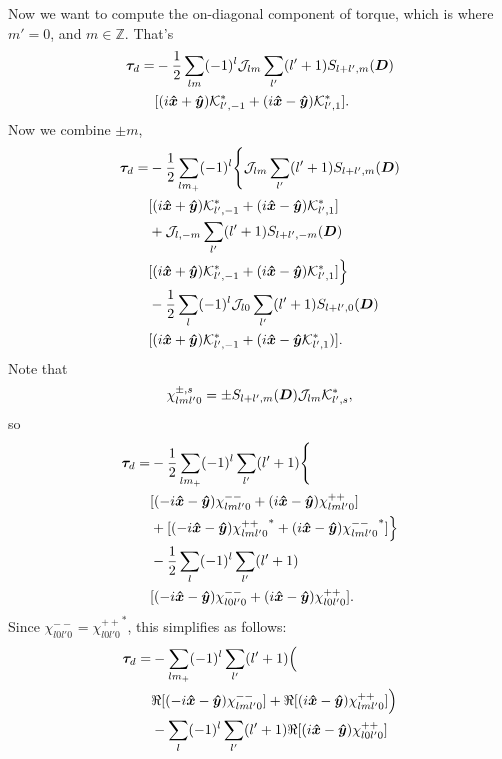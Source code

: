 \documentclass[aps,twocolumn,secnumarabic,balancelastpage,amsmath,amssymb,nofootinbib,floatfix]{revtex4-1}
\begin{document}
Now we want to compute the on-diagonal component of torque, which is where $m'=0$, and $m\in \mathbb{Z}.$ That's
\begin{equation*}
\begin{aligned}
\bm \tau_d = &-\frac{1}{2}\sum_{lm}(-1)^l\mathcal{J}_{lm}\sum_{l'}(l'+1)S_{l+l',m}(\bm D) \\
&[(i\bm{\hat x} + \bm{\hat y})\mathcal{K}^*_{l',-1}+(i\bm{\hat x}-\bm{\hat y})\mathcal{K}^*_{l',1}].
\end{aligned}
\end{equation*}
Now we combine $\pm m$,
\begin{equation*}
\begin{aligned}
\bm \tau_d = &-\frac{1}{2}\sum_{lm_+}(-1)^l\Bigg\{\mathcal{J}_{lm}\sum_{l'}(l'+1)S_{l+l',m}(\bm D) \\
&[(i\bm{\hat x} + \bm{\hat y})\mathcal{K}^*_{l',-1}+(i\bm{\hat x}-\bm{\hat y})\mathcal{K}^*_{l',1}]\\
& + \mathcal{J}_{l,-m}\sum_{l'}(l'+1)S_{l+l',-m}(\bm D) \\
& [(i\bm{\hat x} + \bm{\hat y})\mathcal{K}^*_{l',-1}+(i\bm{\hat x}-\bm{\hat y})\mathcal{K}^*_{l',1}]\Big\}\\
& - \frac{1}{2}\sum_{l}(-1)^l \mathcal{J}_{l0} \sum_{l'}(l'+1)S_{l+l',0}(\bm D)\\
& [(i\bm{\hat x} + \bm{\hat y})\mathcal{K}^*_{l',-1} + (i\bm{\hat x} - \bm{\hat y} \mathcal{K}^*_{l',1})].
\end{aligned}
\end{equation*}
Note that
$$\chi_{lml'0}^{\pm,s} = \pm S_{l+l',m}(\bm D)\mathcal{J}_{lm} \mathcal{K}^*_{l',s},$$
so
\begin{equation*}
\begin{aligned}
\bm \tau_d = &-\frac{1}{2}\sum_{lm_+}(-1)^l\sum_{l'}(l'+1)\Bigg\{ \\
&[(-i\bm{\hat x} - \bm{\hat y})\chi_{lml'0}^{--}+(i\bm{\hat x}-\bm{\hat y})\chi_{lml'0}^{++}]\\
& + [(-i\bm{\hat x} - \bm{\hat y}){\chi_{lml'0}^{++}}^*+(i\bm{\hat x}-\bm{\hat y}){\chi_{lml'0}^{--}}^*]\Big\}\\
& - \frac{1}{2}\sum_{l}(-1)^l \sum_{l'}(l'+1)\\
& [(-i\bm{\hat x} - \bm{\hat y})\chi_{l0l'0}^{--} + (i\bm{\hat x} - \bm{\hat y})\chi_{l0l'0}^{++}].
\end{aligned}
\end{equation*}
Since $\chi_{l0l'0}^{--}={\chi_{l0l'0}^{++}}^*$, this simplifies as follows:
\begin{equation*}
\begin{aligned}
\bm \tau_d = &-\sum_{lm_+}(-1)^l\sum_{l'}(l'+1)\Big( \\
&\Re[(-i\bm{\hat x} - \bm{\hat y})\chi_{lml'0}^{--}]+\Re[(i\bm{\hat x}-\bm{\hat y})\chi_{lml'0}^{++}]\Big)\\
& - \sum_{l}(-1)^l \sum_{l'}(l'+1) \Re[(i\bm{\hat x} - \bm{\hat y})\chi_{l0l'0}^{++}]
\end{aligned}
\end{equation*}
\end{document}
